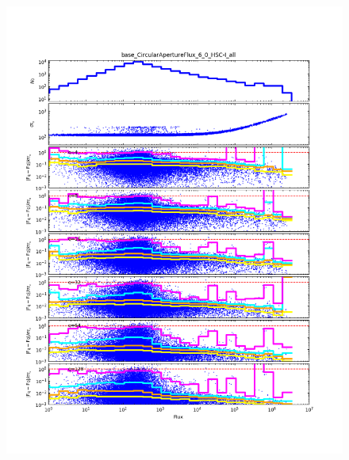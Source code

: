 \begin{figure}[t]
\centering
    \begin{minipage}{.49\textwidth}
        \centering
        \includegraphics[width=1.0\textwidth]{figure/rplot_all_base_CircularApertureFlux_6_0_HSC-I.png}
    \end{minipage}
    \begin{minipage}{.49\textwidth}
        \centering

\end{minipage}
\end{figure}
